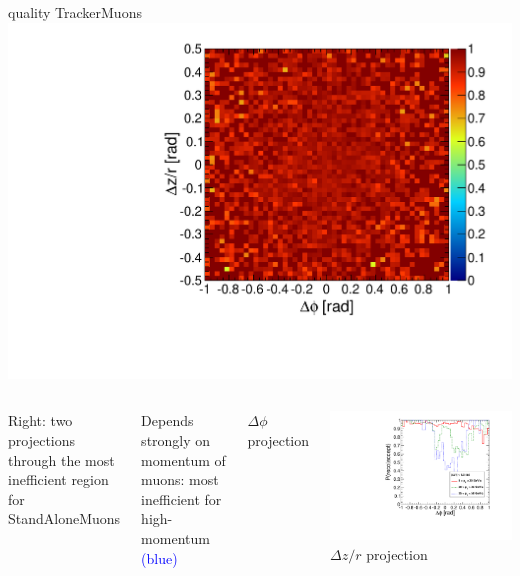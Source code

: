 \documentclass[compress]{beamer}
\begin{document}
\begin{frame}
\begin{columns}
\centering quality TrackerMuons
\includegraphics[width=\linewidth]{barrel_dphidr_TrackerMuon.pdf}
\end{columns}

\begin{columns}
Right: two projections through the most inefficient region for StandAloneMuons

\vspace{0.2 cm}
Depends strongly on momentum of muons: most inefficient for high-momentum \textcolor{blue}{(blue)}

\centering $\Delta\phi$ projection

\includegraphics[width=\linewidth]{barrel_dphi_bypt_StandAloneMuon.pdf}
\centering $\Delta z/r$ projection


\end{columns}
\end{frame}
\end{document}
